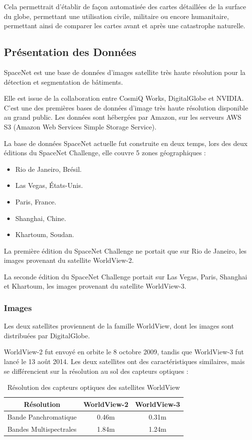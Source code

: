 \documentclass[a4paper, 11pt]{report}
\begin{document}
Cela permettrait d'établir de façon automatisée des cartes détaillées de la surface du globe, permettant une utilisation civile, militaire ou encore humanitaire, permettant ainsi de comparer les cartes avant et après une catastrophe naturelle.
\subsection{Présentation des Données}
SpaceNet \citep{DigitalGlobe2017} est une base de données d'images satellite très haute résolution pour la détection et segmentation de bâtiments.

Elle est issue de la collaboration entre CosmiQ Works, DigitalGlobe et NVIDIA.
C'est une des premières bases de données d'image très haute résolution disponible au grand public.
Les données sont hébergées par Amazon, sur les serveurs AWS S3 (Amazon Web Services Simple Storage Service).

La base de données SpaceNet actuelle fut construite en deux temps, lors des deux éditions du SpaceNet Challenge, elle couvre 5 zones géographiques :
\begin{itemize}
	\item Rio de Janeiro, Brésil.
	\item Las Vegas, États-Unis.
	\item Paris, France.
	\item Shanghai, Chine.
	\item Khartoum, Soudan.
\end{itemize}

La première édition du SpaceNet Challenge ne portait que sur Rio de Janeiro, les images provenant du satellite WorldView-2.

La seconde édition du SpaceNet Challenge portait sur Las Vegas, Paris, Shanghai et Khartoum, les images provenant du satellite WorldView-3.

\subsubsection{Images}
Les deux satellites proviennent de la famille WorldView, dont les images sont distribuées par DigitalGlobe. 

WorldView-2 fut envoyé en orbite le 8 octobre 2009, tandis que WorldView-3 fut lancé le 13 août 2014.
Les deux satellites ont des caractéristiques similaires, mais se différencient sur la résolution au sol des capteurs optiques :
\begin{table}[H]
	\centering
	\begin{tabular}{|c|c|c|}
	\hline 
	Résolution & WorldView-2 & WorldView-3 \\ 
	\hline 
	Bande Panchromatique & 0.46m & 0.31m \\ 
	\hline 
	Bandes Multispectrales & 1.84m & 1.24m \\ 
	\hline
	\end{tabular}
	\caption{Résolution des capteurs optiques des satellites WorldView}	
\end{table}
\end{document}
